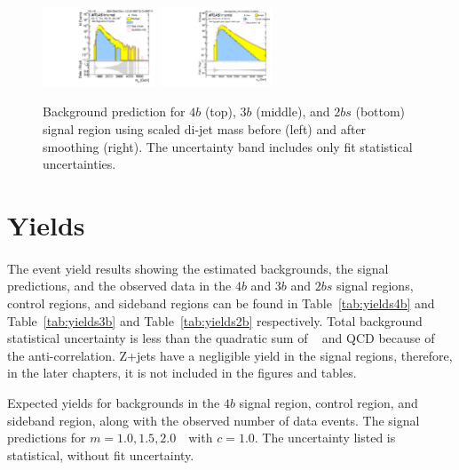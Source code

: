 \begin{figure}[htbp!]
\begin{center}
\includegraphics[width=0.3\textwidth,angle=-90]{figures/boosted/Signal/b77_TwoTag_split_Signal_mHH_pole_1_blind.pdf}
\includegraphics[width=0.3\textwidth,angle=-90]{figures/boosted/Smooth/Moriond_bkg_9_TwoTag_split_pole_Signal_mHH_pole_1_blind.pdf}
\end{center}
\caption{Background prediction for $4b$ (top), $3b$ (middle), and $2bs$ (bottom) signal region using scaled di-jet mass before (left) and after smoothing (right). The uncertainty band includes only fit statistical uncertainties.}
\label{fig:signal-region-mjjscaled-smooth-bkg-noSYS}
\end{figure}

\section{Yields}
\label{sec:yields}
\paragraph{}
The event yield results showing the estimated backgrounds, the signal predictions, and the observed data in the $4b$ and $3b$ and $2bs$ signal regions, control regions, and sideband regions can be found in Table~\ref{tab:yields4b} and Table~\ref{tab:yields3b} and Table~\ref{tab:yields2b} respectively. 
Total background statistical uncertainty is less than the quadratic sum of \ttbar~ and QCD because of the anti-correlation.
Z+jets have a negligible yield in the signal regions, therefore, in the later chapters, it is not included in the figures and tables.

\begin{table}[htbp!]
\footnotesize
\begin{center}
\caption{Expected yields for backgrounds in the $4b$ signal region, control region, and sideband region, along with the observed number of data events.  The signal predictions for \Grav $m=1.0, 1.5, 2.0$~\TeV\ with $c=1.0$. The uncertainty listed is statistical, without fit uncertainty.}

\label{tab:yields4b}
\end{center}
\end{table}


